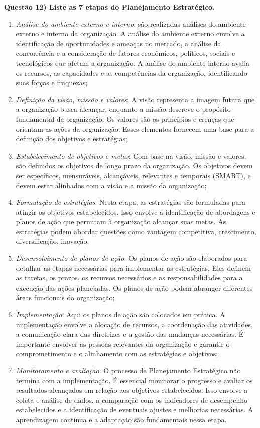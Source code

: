 \documentclass[11pt]{article}
\begin{document}
\noindent \textbf{Questão 12) Liste as 7 etapas do Planejamento Estratégico.}\par
\begin{enumerate}
    \item \emph{Análise do ambiente externo e interno}: são realizadas análises do ambiente externo e interno da organização. A análise do ambiente externo envolve a identificação de oportunidades e ameaças no mercado, a análise da concorrência e a consideração de fatores econômicos, políticos, sociais e tecnológicos que afetam a organização. A análise do ambiente interno avalia os recursos, as capacidades e as competências da organização, identificando suas forças e fraquezas;
    \item \emph{Definição da visão, missão e valores}: A visão representa a imagem futura que a organização busca alcançar, enquanto a missão descreve o propósito fundamental da organização. Os valores são os princípios e crenças que orientam as ações da organização. Esses elementos fornecem uma base para a definição dos objetivos e estratégias;
    \item \emph{Estabelecimento de objetivos e metas}: Com base na visão, missão e valores, são definidos os objetivos de longo prazo da organização. Os objetivos devem ser específicos, mensuráveis, alcançáveis, relevantes e temporais (SMART), e devem estar alinhados com a visão e a missão da organização;
    \item \emph{Formulação de estratégias}: Nesta etapa, as estratégias são formuladas para atingir os objetivos estabelecidos. Isso envolve a identificação de abordagens e planos de ação que permitam à organização alcançar suas metas. As estratégias podem abordar questões como vantagem competitiva, crescimento, diversificação, inovação;
    \item \emph{Desenvolvimento de planos de ação}: Os planos de ação são elaborados para detalhar as etapas necessárias para implementar as estratégias. Eles definem as tarefas, os prazos, os recursos necessários e as responsabilidades para a execução das ações planejadas. Os planos de ação podem abranger diferentes áreas funcionais da organização;
    \item \emph{Implementação}: Aqui os planos de ação são colocados em prática. A implementação envolve a alocação de recursos, a coordenação das atividades, a comunicação clara das diretrizes e a gestão das mudanças necessárias. É importante envolver as pessoas relevantes da organização e garantir o comprometimento e o alinhamento com as estratégias e objetivos;
    \item \emph{Monitoramento e avaliação}: O processo de Planejamento Estratégico não termina com a implementação. É essencial monitorar o progresso e avaliar os resultados alcançados em relação aos objetivos estabelecidos. Isso envolve a coleta e análise de dados, a comparação com os indicadores de desempenho estabelecidos e a identificação de eventuais ajustes e melhorias necessárias. A aprendizagem contínua e a adaptação são fundamentais nessa etapa.
\end{enumerate}
\end{document}
